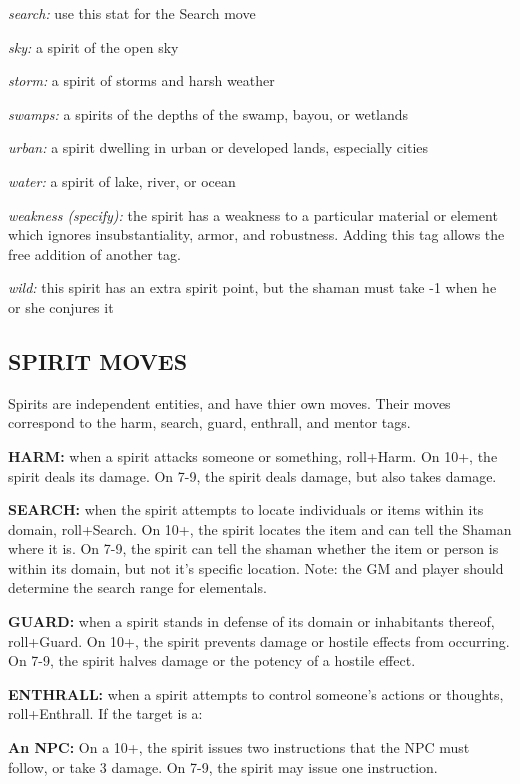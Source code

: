 \documentclass[oneside,10pt]{article}
\begin{document}
\begin{multicols}{2}
\begin{adjustwidth*}{.5cm}{.5cm}
\textit{search:} use this stat for the Search move

\textit{sky:} a spirit of the open sky

\textit{storm:} a spirit of storms and harsh weather

\textit{swamps:} a spirits of the depths of the swamp, bayou, or
wetlands

\textit{urban:} a spirit dwelling in urban or developed
lands, especially cities

\textit{water:} a spirit of lake, river, or ocean 

\textit{weakness (specify):} the spirit has a weakness to a particular
material or element which ignores insubstantiality, armor,
and robustness. Adding this tag allows the free addition of
another tag.

\textit{wild:} this spirit has an extra spirit point, but the shaman
must take -1 when he or she conjures it
\end{adjustwidth*}

\subsection{SPIRIT MOVES}
Spirits are independent entities, and have thier own moves.
Their moves correspond to the harm, search, guard, enthrall,
and mentor tags.

\textbf{HARM:} when a spirit attacks someone or something,
roll+Harm. On 10+, the spirit deals its damage. On 7-9, the
spirit deals damage, but also takes damage.

\textbf{SEARCH:} when the spirit attempts to locate individuals or
items within its domain, roll+Search. On 10+, the spirit locates the item and can tell the Shaman where it is. On 7-9,
the spirit can tell the shaman whether the item or person is
within its domain, but not it’s specific location. Note: the GM
and player should determine the search range for
elementals.

\textbf{GUARD:} when a spirit stands in defense of its domain or
inhabitants thereof, roll+Guard. On 10+, the spirit prevents
damage or hostile effects from occurring. On 7-9, the spirit
halves damage or the potency of a hostile effect.

\textbf{ENTHRALL:} when a spirit attempts to control someone’s
actions or thoughts, roll+Enthrall. If the target
is a:
\begin{adjustwidth*}{.5cm}{.5cm}
\textbf{An NPC:} On a 10+, the spirit issues two instructions
that the NPC must follow, or take 3 damage. On 7-9,
the spirit may issue one instruction.


\end{adjustwidth*}
\end{multicols}
\end{document}
